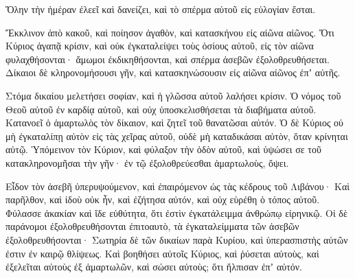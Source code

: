 {Ὅλην τὴν ἡμέραν ἐλεεῖ καὶ δανείζει, καὶ τὸ σπέρμα αὐτοῦ εἰς εὐλογίαν ἔσται.
\par }{\PP {}Ἔκκλινον ἀπὸ κακοῦ, καὶ ποίησον ἀγαθὸν, καὶ κατασκήνου εἰς αἰῶνα αἰῶνος.
Ὅτι Κύριος ἀγαπᾷ κρίσιν, καὶ οὐκ ἐγκαταλείψει τοὺς ὁσίους αὐτοῦ, εἰς τὸν αἰῶνα φυλαχθήσονται· ἄμωμοι ἐκδικηθήσονται, καὶ σπέρμα ἀσεβῶν ἐξολοθρευθήσεται.
Δίκαιοι δὲ κληρονομήσουσι γῆν, καὶ κατασκηνώσουσιν εἰς αἰῶνα αἰῶνος ἐπʼ αὐτῆς.
\par }{\PP {}Στόμα δικαίου μελετήσει σοφίαν, καὶ ἡ γλῶσσα αὐτοῦ λαλήσει κρίσιν.
Ὁ νόμος τοῦ Θεοῦ αὐτοῦ ἐν καρδίᾳ αὐτοῦ, καὶ οὐχ ὑποσκελισθήσεται τὰ διαβήματα αὐτοῦ.
Κατανοεῖ ὁ ἁμαρτωλὸς τὸν δίκαιον, καὶ ζητεῖ τοῦ θανατῶσαι αὐτόν.
Ὁ δὲ Κύριος οὐ μὴ ἐγκαταλίπῃ αὐτὸν εἰς τὰς χεῖρας αὐτοῦ, οὐδὲ μὴ καταδικάσαι αὐτὸν, ὅταν κρίνηται αὐτῷ.
Ὑπόμεινον τὸν Κύριον, καὶ φύλαξον τὴν ὁδὸν αὐτοῦ, καὶ ὑψώσει σε τοῦ κατακληρονομῆσαι τὴν γῆν· ἐν τῷ ἐξολοθρεύεσθαι ἁμαρτωλοὺς, ὄψει.
\par }{\PP {}Εἶδον τὸν ἀσεβῆ ὑπερυψούμενον, καὶ ἐπαιρόμενον ὡς τὰς κέδρους τοῦ Λιβάνου·
Καὶ παρῆλθον, καὶ ἰδοὺ οὐκ ἦν, καὶ ἐζήτησα αὐτόν, καὶ οὐχ εὑρέθη ὁ τόπος αὐτοῦ.
Φύλασσε ἀκακίαν καὶ ἴδε εὐθύτητα, ὅτι ἐστὶν ἐγκατάλειμμα ἀνθρώπῳ εἰρηνικῷ.
Οἱ δὲ παράνομοι ἐξολοθρευθήσονται ἐπιτοαυτὸ, τὰ ἐγκαταλείμματα τῶν ἀσεβῶν ἐξολοθρευθήσονται·
Σωτηρία δὲ τῶν δικαίων παρὰ Κυρίου, καὶ ὑπερασπιστὴς αὐτῶν ἐστιν ἐν καιρῷ θλίψεως.
Καὶ βοηθήσει αὐτοῖς Κύριος, καὶ ῥύσεται αὐτοὺς, καὶ ἐξελεῖται αὐτοὺς ἐξ ἁμαρτωλῶν, καὶ σώσει αὐτοὺς; ὅτι ἤλπισαν ἐπʼ αὐτόν.

}
